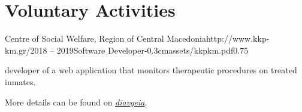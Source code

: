 \documentclass{mycv}
\begin{document}
	\section{Voluntary Activities}
	\begin{EntryDatedLogo}{Centre of Social Welfare, Region of Central Macedonia}{http://www.kkp-km.gr/}{2018 -- 2019}{Software Developer}{-0.3cm}{assets/kkpkm.pdf}{0.75}
		\begin{Itemize}
			\item developer of a web application that monitors therapeutic procedures on treated inmates.
			\item More details can be found on \href{https://diavgeia.gov.gr/decision/view/\%CE\%A8\%CE\%A6\%CE\%A1\%CE\%93\%CE\%9F\%CE\%9E\%CE\%A7\%CE\%A3-\%CE\%A0\%CE\%93\%CE\%A6}{\textit{diavgeia}}.
		\end{Itemize}
	\end{EntryDatedLogo}
\end{document}
